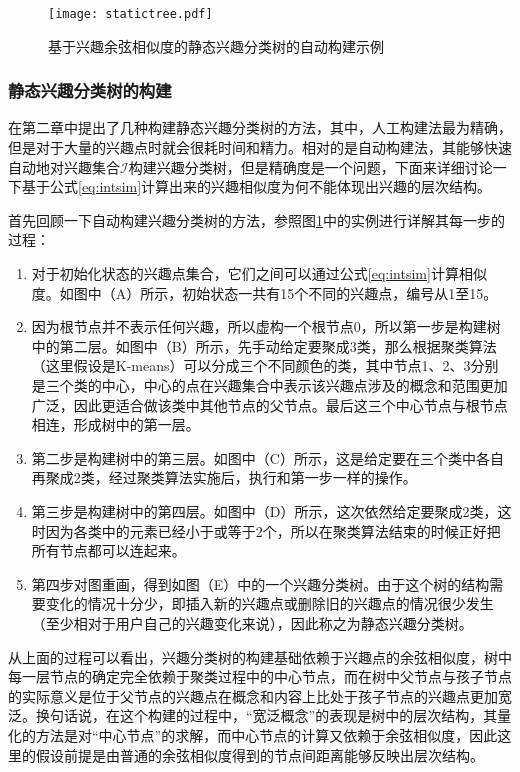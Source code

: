 \begin{figure}
\centering
\texttt{[image: statictree.pdf]}
\caption{基于兴趣余弦相似度的静态兴趣分类树的自动构建示例}
\label{fig:statictree}
\end{figure}

\subsubsection{静态兴趣分类树的构建}
在第二章中提出了几种构建静态兴趣分类树的方法，其中，人工构建法最为精确，但是对于大量的兴趣点时就会很耗时间和精力。相对的是自动构建法，其能够快速自动地对兴趣集合$\mathcal{I}$构建兴趣分类树，但是精确度是一个问题，下面来详细讨论一下基于公式\ref{eq:intsim}计算出来的兴趣相似度为何不能体现出兴趣的层次结构。

首先回顾一下自动构建兴趣分类树的方法，参照图\ref{fig:statictree}中的实例进行详解其每一步的过程：
\begin{enumerate}
  \item 对于初始化状态的兴趣点集合，它们之间可以通过公式\ref{eq:intsim}计算相似度。如图中（A）所示，初始状态一共有15个不同的兴趣点，编号从1至15。
  \item 因为根节点并不表示任何兴趣，所以虚构一个根节点0，所以第一步是构建树中的第二层。如图中（B）所示，先手动给定要聚成3类，那么根据聚类算法（这里假设是K-means）可以分成三个不同颜色的类，其中节点1、2、3分别是三个类的中心，中心的点在兴趣集合中表示该兴趣点涉及的概念和范围更加广泛，因此更适合做该类中其他节点的父节点。最后这三个中心节点与根节点相连，形成树中的第一层。
  \item 第二步是构建树中的第三层。如图中（C）所示，这是给定要在三个类中各自再聚成2类，经过聚类算法实施后，执行和第一步一样的操作。
  \item 第三步是构建树中的第四层。如图中（D）所示，这次依然给定要聚成2类，这时因为各类中的元素已经小于或等于2个，所以在聚类算法结束的时候正好把所有节点都可以连起来。
  \item 第四步对图重画，得到如图（E）中的一个兴趣分类树。由于这个树的结构需要变化的情况十分少，即插入新的兴趣点或删除旧的兴趣点的情况很少发生（至少相对于用户自己的兴趣变化来说），因此称之为静态兴趣分类树。
\end{enumerate}

从上面的过程可以看出，兴趣分类树的构建基础依赖于兴趣点的余弦相似度，树中每一层节点的确定完全依赖于聚类过程中的中心节点，而在树中父节点与孩子节点的实际意义是位于父节点的兴趣点在概念和内容上比处于孩子节点的兴趣点更加宽泛。换句话说，在这个构建的过程中，“宽泛概念”的表现是树中的层次结构，其量化的方法是对“中心节点”的求解，而中心节点的计算又依赖于余弦相似度，因此这里的假设前提是由普通的余弦相似度得到的节点间距离能够反映出层次结构。

